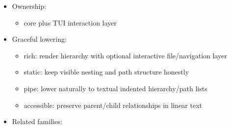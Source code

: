 \begin{itemize}
  \begin{itemize}
  \tightlist
  \item
    labels should make nesting meaningful even when indentation is flattened or linearized
  \item
    path context should be explicit when many siblings have similar names
  \item
    use \texttt{f\allowbreak{}i\allowbreak{}l\allowbreak{}e\allowbreak{}P\allowbreak{}i\allowbreak{}c\allowbreak{}k\allowbreak{}e\allowbreak{}r\allowbreak{}S\allowbreak{}u\allowbreak{}r\allowbreak{}f\allowbreak{}a\allowbreak{}c\allowbreak{}e\allowbreak{}(\allowbreak{})} when the picker lives inside a rich TUI pane and should inherit shared viewport masking semantics; keep \texttt{f\allowbreak{}i\allowbreak{}l\allowbreak{}e\allowbreak{}P\allowbreak{}i\allowbreak{}c\allowbreak{}k\allowbreak{}e\allowbreak{}r\allowbreak{}(\allowbreak{})} as the explicit text-lowering path
  \item
    directories should remain visually distinct from files, and moving to a parent or child path should be explicit rather than hidden behind overloaded actions
  \item
    \texttt{t\allowbreak{}r\allowbreak{}e\allowbreak{}e\allowbreak{}(\allowbreak{})} should stay focused on passive hierarchy display; if arbitrary hierarchy needs keyboard-owned non-filesystem inspection later, that should become an explicit interactive tree family instead of overloading \texttt{t\allowbreak{}r\allowbreak{}e\allowbreak{}e\allowbreak{}(\allowbreak{})} itself
  \end{itemize}
\item
  Ownership:

  \begin{itemize}
  \tightlist
  \item
    core plus TUI interaction layer
  \end{itemize}
\item
  Graceful lowering:

  \begin{itemize}
  \tightlist
  \item
    rich: render hierarchy with optional interactive file/navigation layer
  \item
    static: keep visible nesting and path structure honestly
  \item
    pipe: lower naturally to textual indented hierarchy/path lists
  \item
    accessible: preserve parent/child relationships in linear text
  \end{itemize}
\item
  Related families:


\end{itemize}
